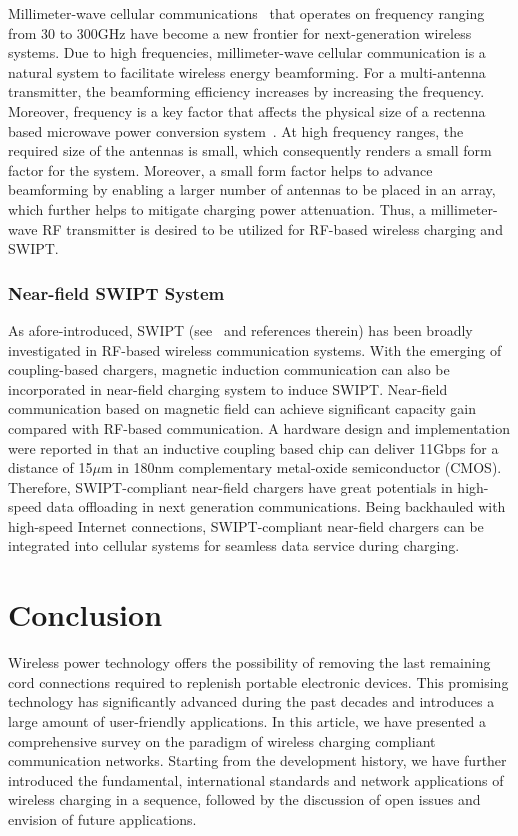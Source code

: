 \documentclass[twocolumn,10pt]{IEEEtran}
\begin{document}
 
Millimeter-wave cellular communications~\cite{S.2014Rangan} that operates on frequency ranging from 30 to 300GHz have become a new frontier for next-generation wireless systems. Due to high frequencies, millimeter-wave cellular communication is a natural system to facilitate wireless energy beamforming. For a multi-antenna transmitter, the beamforming efficiency increases by increasing the frequency. Moreover, frequency is a key factor that affects the physical size of a rectenna based microwave power conversion system~\cite{G.2008Chattopadhyay}. At high frequency ranges, the required size of the antennas is small, which consequently renders a small form factor for the system. Moreover, a small form factor helps to advance beamforming by enabling a larger number of antennas to be placed in an array, which further helps to mitigate charging power attenuation. Thus,  a millimeter-wave RF transmitter is desired to be utilized for RF-based wireless charging and SWIPT.   

 

\subsubsection{Near-field SWIPT System}
As afore-introduced, SWIPT (see~\cite{X.LuSurvey} and references therein) has been broadly investigated in RF-based wireless communication systems. With the emerging of coupling-based chargers, magnetic induction communication \cite{Z.July2010Sun} can also be incorporated in near-field charging system to induce SWIPT.  
Near-field communication based on magnetic field can achieve significant capacity gain compared with RF-based communication.
A hardware design and implementation were reported in \cite{N.2009Miura} that an inductive coupling based chip can deliver 11Gbps for a distance of 15$\mu$m in 180nm complementary metal-oxide semiconductor (CMOS).
Therefore, SWIPT-compliant near-field chargers have great potentials in high-speed data offloading in next generation communications. Being backhauled with high-speed Internet connections,  SWIPT-compliant near-field chargers can be integrated into cellular systems for seamless data service during charging.    

 


\section{Conclusion}
 
Wireless power technology offers the possibility of removing the last remaining cord connections required to replenish portable electronic devices. This promising technology has significantly advanced during the past decades and introduces a large amount of user-friendly applications. In this article, we have presented a comprehensive survey on the paradigm of wireless charging compliant communication networks. Starting from the development history, we have further introduced the fundamental, international standards and network applications of wireless charging in a sequence, followed by the discussion of open issues and envision of future applications.  
\end{document}

